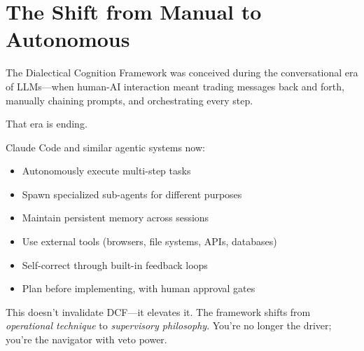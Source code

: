 \chapter{The Shift from Manual to Autonomous}

The Dialectical Cognition Framework was conceived during the conversational era of LLMs---when human-AI interaction meant trading messages back and forth, manually chaining prompts, and orchestrating every step.

That era is ending.

Claude Code and similar agentic systems now:
\begin{itemize}
    \item Autonomously execute multi-step tasks
    \item Spawn specialized sub-agents for different purposes
    \item Maintain persistent memory across sessions
    \item Use external tools (browsers, file systems, APIs, databases)
    \item Self-correct through built-in feedback loops
    \item Plan before implementing, with human approval gates
\end{itemize}

This doesn't invalidate DCF---it elevates it. The framework shifts from \emph{operational technique} to \emph{supervisory philosophy}. You're no longer the driver; you're the navigator with veto power.

